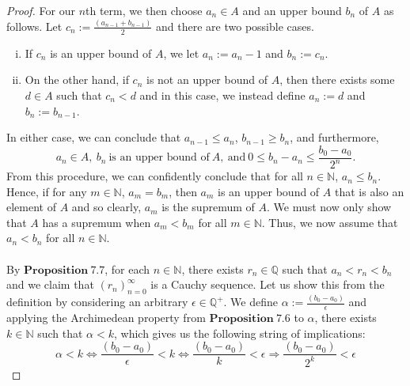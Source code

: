 \documentclass[12pt]{article}
\theoremstyle{definition}
\theoremstyle{remark}
\begin{document}
\begin{proof}
\noindent For our $n$th term, we then choose $a_n\in A$ and an upper bound $b_n$ of $A$ as follows. Let $c_n:=\frac{(a_{n-1}+b_{n-1})}{2}$ and there are two possible cases.
        \begin{enumerate}[(i)]
            \item If $c_n$ is an upper bound of $A$, we let $a_n:=a_n-1$ and $b_n:=c_n$.
            \item On the other hand, if $c_n$ is not an upper bound of $A$, then there exists some $d\in A$ such that $c_n<d$ and in this case, we instead define $a_n:=d$ and $b_n:=b_{n-1}$.
        \end{enumerate}
In either case, we can conclude that $a_{n-1}\leq a_n$, $b_{n-1}\geq b_n$, and furthermore,
$$a_n\in A,\ b_n\ \text{is an upper bound of}\ A,\ \text{and}\ 0\leq b_n-a_n\leq\frac{b_0-a_0}{2^n}.$$
From this procedure, we can confidently conclude that for all $n\in\mathbb{N}$, $a_n\leq b_n$. Hence, if for any $m\in\mathbb{N}$, $a_m=b_m$, then $a_m$ is an upper bound of $A$ that is also an element of $A$ and so clearly, $a_m$ is the supremum of $A$. We must now only show that $A$ has a supremum when $a_m<b_m$ for all $m\in\mathbb{N}$. Thus, we now assume that $a_n<b_n$ for all $n\in\mathbb{N}$.\\\\
 By $\mathbf{Proposition\ 7.7}$, for each $n\in\mathbb{N}$, there exists $r_n\in\mathbb{Q}$ such that $a_n<r_n<b_n$ and we claim that $(r_n)_{n=0}^\infty$ is a Cauchy sequence. Let us show this from the definition by considering an arbitrary $\epsilon\in\mathbb{Q}^+$. We define $\alpha:=\frac{(b_0-a_0)}{\epsilon}$ and applying the Archimedean property from $\mathbf{Proposition\ 7.6}$ to $\alpha$, there exists $k\in\mathbb{N}$ such that $\alpha<k$, which gives us the following string of implications:
 $$\alpha<k\iff\frac{(b_0-a_0)}{\epsilon}<k\iff \frac{(b_0-a_0)}{k}<\epsilon \Rightarrow \frac{(b_0-a_0)}{2^k}<\epsilon$$


\end{proof}
\end{document}
